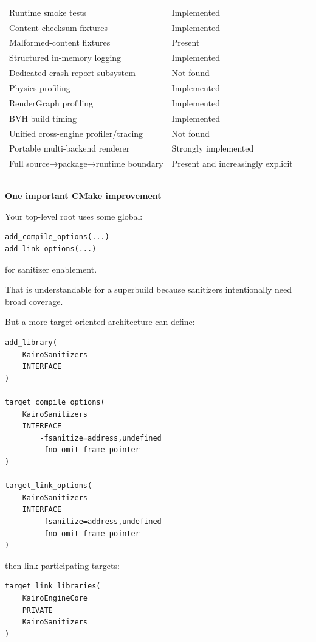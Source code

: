 {\begin{longtable}[]{@{}
  >{\raggedright\arraybackslash}p{}
  >{\raggedright\arraybackslash}p{}@{}}
Runtime smoke tests & Implemented \\
Content checksum fixtures & Implemented \\
Malformed-content fixtures & Present \\
Structured in-memory logging & Implemented \\
Dedicated crash-report subsystem & Not found \\
Physics profiling & Implemented \\
RenderGraph profiling & Implemented \\
BVH build timing & Implemented \\
Unified cross-engine profiler/tracing & Not found \\
Portable multi-backend renderer & Strongly implemented \\
Full source→package→runtime boundary & Present and increasingly explicit \\
\end{longtable}
}

\begin{center}\rule{0.5\linewidth}{0.5pt}\end{center}

\textbf{One important CMake improvement}

Your top-level root uses some global:

\begin{verbatim}
add_compile_options(...)
add_link_options(...)
\end{verbatim}

for sanitizer enablement.

That is understandable for a superbuild because sanitizers intentionally need broad coverage.

But a more target-oriented architecture can define:

\begin{verbatim}
add_library(
    KairoSanitizers
    INTERFACE
)

target_compile_options(
    KairoSanitizers
    INTERFACE
        -fsanitize=address,undefined
        -fno-omit-frame-pointer
)

target_link_options(
    KairoSanitizers
    INTERFACE
        -fsanitize=address,undefined
        -fno-omit-frame-pointer
)
\end{verbatim}

then link participating targets:

\begin{verbatim}
target_link_libraries(
    KairoEngineCore
    PRIVATE
    KairoSanitizers
)
\end{verbatim}

